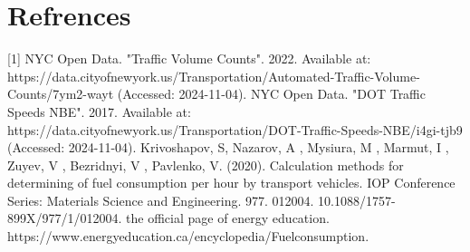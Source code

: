 \section{Refrences}
[1] NYC Open Data. "Traffic Volume Counts". 2022. Available at:
\newline
https://data.cityofnewyork.us/Transportation/Automated-Traffic-Volume-Counts/7ym2-wayt (Accessed: 2024-11-04).
\newline
[2] NYC Open Data. "DOT Traffic Speeds NBE". 2017. Available at: 
\newline
https://data.cityofnewyork.us/Transportation/DOT-Traffic-Speeds-NBE/i4gi-tjb9 (Accessed: 2024-11-04).
\newline
[3]Krivoshapov, S,  Nazarov, A ,  Mysiura, M , Marmut, I , Zuyev, V , Bezridnyi, V , Pavlenko, V. (2020). Calculation methods for determining of fuel consumption per hour by transport vehicles. IOP Conference Series: Materials Science and Engineering. 977. 012004. 10.1088/1757-899X/977/1/012004. 
\newline
[4] the official page of energy education. 
\newline
https://www.energyeducation.ca/encyclopedia/Fuelconsumption.

